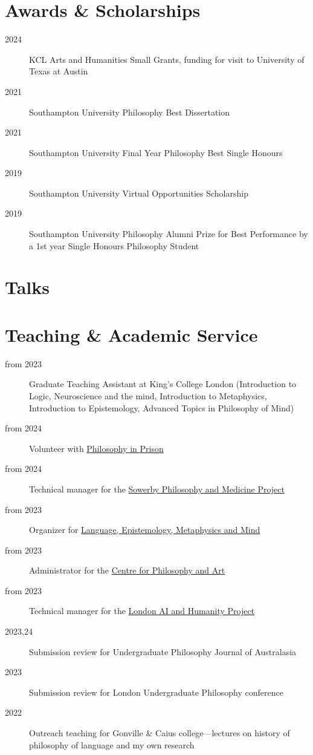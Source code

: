 \documentclass{cv}
\begin{document}
\section*{Awards \& Scholarships}
\label{sec:orgd66f836}
\begin{description}
\item[{2024}] KCL Arts and Humanities Small Grants, funding for visit to
University of Texas at Austin
\item[{2021}] Southampton University Philosophy Best Dissertation
\item[{2021}] Southampton University Final Year Philosophy Best Single
Honours
\item[{2019}] Southampton University Virtual Opportunities Scholarship
\item[{2019}] Southampton University Philosophy Alumni Prize for Best
Performance by a 1st year Single Honours Philosophy Student
\end{description}

\section*{Talks}
\printbibliography[check=Presentation]{}

\section*{Teaching \& Academic Service}
\label{sec:orgaf05ee3}
\begin{description}
\item[{from 2023}] Graduate Teaching Assistant at King's College London
(Introduction to Logic, Neuroscience and the mind, Introduction to
Metaphysics, Introduction to Epistemology, Advanced Topics in
Philosophy of Mind)
\item[{from 2024}] Volunteer with \href{https:\slash{}\slash{}www.philosophyinprison.com\slash{}}{Philosophy in Prison}
\item[{from 2024}] Technical manager for the \href{https:\slash{}\slash{}www.philosophyandmedicine.org\slash{}}{Sowerby Philosophy and
Medicine Project}
\item[{from 2023}] Organizer for \href{https:\slash{}\slash{}www.lemm-london.co.uk\slash{}}{Language, Epistemology, Metaphysics and Mind}
\item[{from 2023}] Administrator for the \href{https:\slash{}\slash{}philosophyarts.co.uk\slash{}}{Centre for Philosophy and Art}
\item[{from 2023}] Technical manager for the \href{https:\slash{}\slash{}www.ai-humanity-london.com\slash{}}{London AI and Humanity Project}
\item[{2023,24}] Submission review for Undergraduate Philosophy Journal of
Australasia
\item[{2023}] Submission review for London Undergraduate Philosophy
conference
\item[{2022}] Outreach teaching for Gonville \& Caius college---lectures on
history of philosophy of language and my own research
\end{description}
\end{document}
